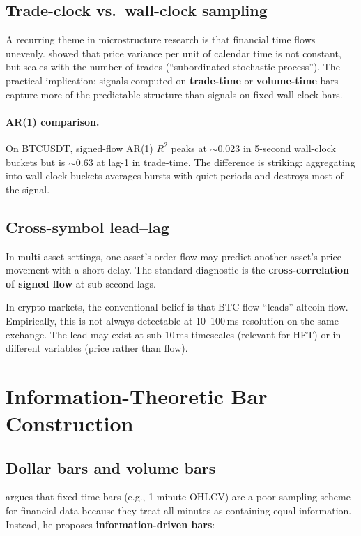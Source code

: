 \documentclass[11pt,a4paper]{article}
\begin{document}
\subsection{Trade-clock vs.\ wall-clock sampling}

A recurring theme in microstructure research is that financial time
flows unevenly. \citet{clark1973subordinated} showed that price
variance per unit of calendar time is not constant, but scales with
the number of trades (``subordinated stochastic process''). The
practical implication: signals computed on \textbf{trade-time} or
\textbf{volume-time} bars capture more of the predictable structure
than signals on fixed wall-clock bars.

\paragraph{AR(1) comparison.}
On BTCUSDT, signed-flow AR(1) $R^2$ peaks at $\sim$0.023 in 5-second
wall-clock buckets but is $\sim$0.63 at lag-1 in trade-time. The
difference is striking: aggregating into wall-clock buckets averages
bursts with quiet periods and destroys most of the signal.

\subsection{Cross-symbol lead--lag}

In multi-asset settings, one asset's order flow may predict another
asset's price movement with a short delay. The standard diagnostic is
the \textbf{cross-correlation of signed flow} at sub-second lags.

In crypto markets, the conventional belief is that BTC flow ``leads''
altcoin flow. Empirically, this is not always detectable at 10--100\,ms
resolution on the same exchange. The lead may exist at sub-10\,ms
timescales (relevant for HFT) or in different variables (price rather
than flow).

\section{Information-Theoretic Bar Construction}

\subsection{Dollar bars and volume bars}

\citet{deprado2018advances} argues that fixed-time bars (e.g., 1-minute
OHLCV) are a poor sampling scheme for financial data because they treat
all minutes as containing equal information. Instead, he proposes
\textbf{information-driven bars}:
\end{document}
